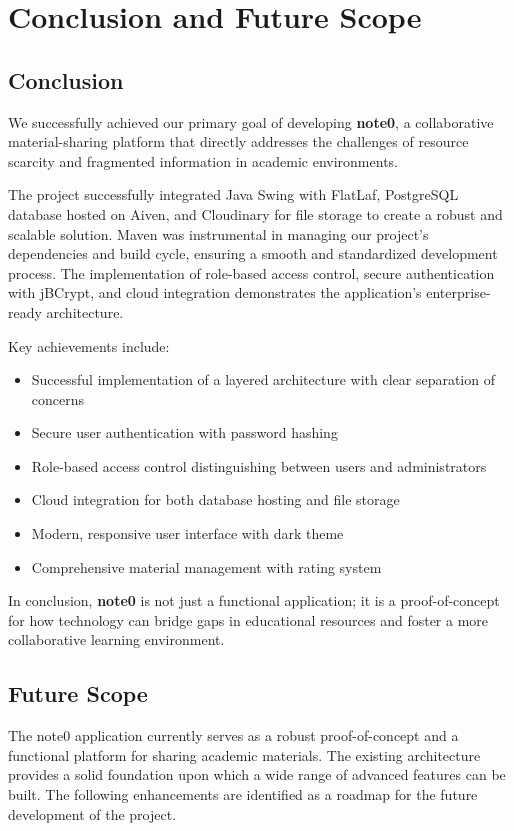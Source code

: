 \documentclass[12pt, a4paper]{report}
\begin{document}
\chapter{Conclusion and Future Scope}

\section{Conclusion}
We successfully achieved our primary goal of developing \textbf{note0}, a collaborative material-sharing platform that directly addresses the challenges of resource scarcity and fragmented information in academic environments.

The project successfully integrated Java Swing with FlatLaf, PostgreSQL database hosted on Aiven, and Cloudinary for file storage to create a robust and scalable solution. Maven was instrumental in managing our project's dependencies and build cycle, ensuring a smooth and standardized development process. The implementation of role-based access control, secure authentication with jBCrypt, and cloud integration demonstrates the application's enterprise-ready architecture.

Key achievements include:
\begin{itemize}
    \item Successful implementation of a layered architecture with clear separation of concerns
    \item Secure user authentication with password hashing
    \item Role-based access control distinguishing between users and administrators
    \item Cloud integration for both database hosting and file storage
    \item Modern, responsive user interface with dark theme
    \item Comprehensive material management with rating system
\end{itemize}

In conclusion, \textbf{note0} is not just a functional application; it is a proof-of-concept for how technology can bridge gaps in educational resources and foster a more collaborative learning environment.

\section{Future Scope}
The note0 application currently serves as a robust proof-of-concept and a functional platform for sharing academic materials. The existing architecture provides a solid foundation upon which a wide range of advanced features can be built. The following enhancements are identified as a roadmap for the future development of the project.
\end{document}
